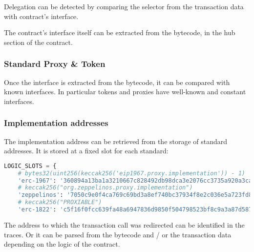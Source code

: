 Delegation can be detected by comparing the selector from the transaction data with contract's interface.

The contract's interface itself can be extracted from the bytecode, in the hub section of the contract.

\subsubsection{Standard Proxy \& Token}

Once the interface is extracted from the bytecode, it can be compared with known interfaces.
In particular tokens and proxies have well-known and constant interfaces.

\subsubsection{Implementation addresses}

The implementation address can be retrieved from the storage of standard addresses.
It is stored at a fixed slot for each standard:

\begin{lstlisting}[language=Python]
LOGIC_SLOTS = {
    # bytes32(uint256(keccak256('eip1967.proxy.implementation')) - 1)
    'erc-1967': '360894a13ba1a3210667c828492db98dca3e2076cc3735a920a3ca505d382bbc',
    # keccak256("org.zeppelinos.proxy.implementation")
    'zeppelinos': '7050c9e0f4ca769c69bd3a8ef740bc37934f8e2c036e5a723fd8ee048ed3f8c3',
    # keccak256("PROXIABLE")
    'erc-1822': 'c5f16f0fcc639fa48a6947836d9850f504798523bf8c9a3a87d5876cf622bcf7',}
\end{lstlisting}

The address to which the transaction call was redirected can be identified in the traces.
Or it can be parsed from the bytecode and / or the transaction data depending on the logic of the contract.
